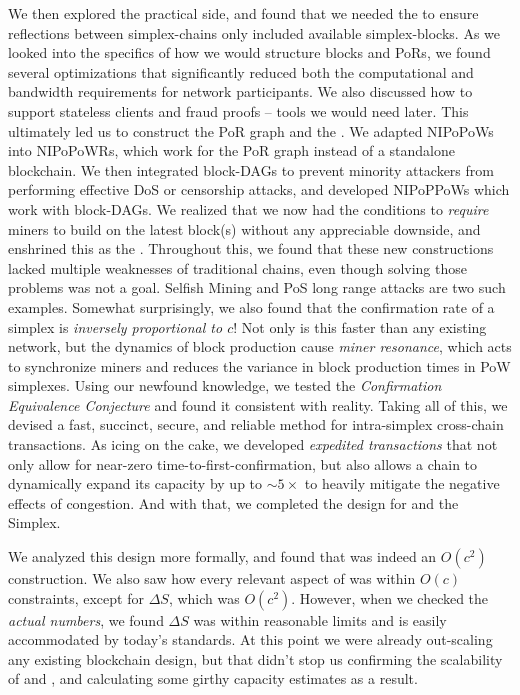 We then explored the practical side, and found that we needed the \AxiomOfAvailability to ensure reflections between simplex-chains only included available simplex-blocks.
As we looked into the specifics of how we would structure blocks and PoRs, we found several optimizations that significantly reduced both the computational and bandwidth requirements for network participants.
We also discussed how to support stateless clients and fraud proofs -- tools we would need later.
This ultimately led us to construct the PoR graph and the \AxiomOfMaximalReflection{}.
We adapted NIPoPoWs into NIPoPoWRs, which work for the PoR graph instead of a standalone blockchain.
We then integrated block-DAGs to prevent minority attackers from performing effective DoS or censorship attacks, and developed NIPoPPoWs which work with block-DAGs.
We realized that we now had the conditions to \emph{require} miners to build on the latest block(s) without any appreciable downside, and enshrined this as the \AxiomOfUnifiedAncestry{}.
Throughout this, we found that these new constructions lacked multiple weaknesses of traditional chains, even though solving those problems was not a goal.
Selfish Mining and PoS long range attacks are two such examples.
Somewhat surprisingly, we also found that the confirmation rate of a simplex is \emph{inversely proportional to $c$}!
Not only is this faster than any existing network, but the dynamics of block production cause \emph{miner resonance}, which acts to synchronize miners and reduces the variance in block production times in PoW simplexes.
Using our newfound knowledge, we tested the \emph{Confirmation Equivalence Conjecture} and found it consistent with reality.
Taking all of this, we devised a fast, succinct, secure, and reliable method for intra-simplex cross-chain transactions.
As icing on the cake, we developed \emph{expedited transactions} that not only allow for near-zero time-to-first-confirmation, but also allows a chain to dynamically expand its capacity by up to $\sim 5\times$ to heavily mitigate the negative effects of congestion.
And with that, we completed the design for  and the Simplex.

We analyzed this design more formally, and found that  was indeed an $O(c^2)$ construction.
We also saw how every relevant aspect of  was within $O(c)$ constraints, except for $\Delta S$, which was $O(c^2)$.
However, when we checked the \emph{actual numbers}, we found $\Delta S$ was within reasonable limits and is easily accommodated by today's standards.
At this point we were already out-scaling any existing blockchain design, but that didn't stop us confirming the scalability of  and , and calculating some girthy capacity estimates as a result.

